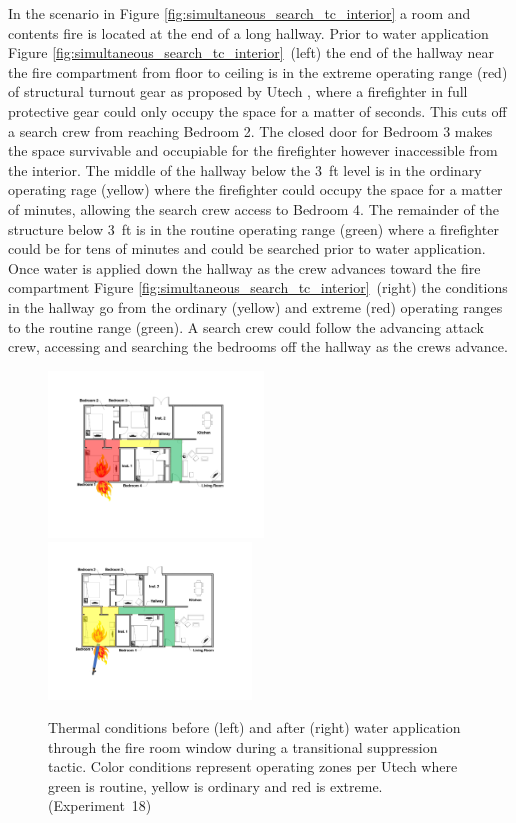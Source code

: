 \documentclass[12pt,oneside]{book}
\begin{document}
In the scenario in Figure \ref{fig:simultaneous_search_tc_interior} a room and contents fire is located at the end of a long hallway. Prior to water application Figure \ref{fig:simultaneous_search_tc_interior}~(left) the end of the hallway near the fire compartment from floor to ceiling is in the extreme operating range (red) of structural turnout gear as proposed by Utech \cite{Utech_Firefighter_Clothing}, where a firefighter in full protective gear could only occupy the space for a matter of seconds. This cuts off a search crew from reaching Bedroom 2. The closed door for Bedroom 3 makes the space survivable and occupiable for the firefighter however inaccessible from the interior. The middle of the hallway below the 3~ft level is in the ordinary operating rage (yellow) where the firefighter could occupy the space for a matter of minutes, allowing the search crew access to Bedroom 4. The remainder of the structure below 3~ft is in the routine operating range (green) where a firefighter could be for tens of minutes and could be searched prior to water application. Once water is applied down the hallway as the crew advances toward the fire compartment Figure \ref{fig:simultaneous_search_tc_interior}~(right) the conditions in the hallway go from the ordinary (yellow) and extreme (red)  operating ranges to the routine range (green). A search crew could follow the advancing attack crew, accessing and searching the bedrooms off the hallway as the crews advance. 

\begin{figure}[H]
\centering
\includegraphics[width=0.51\textwidth]{../0_Images/Tactical_Considerations/Simultaneous_Search/Transitional_Pre}
\includegraphics[width=0.48\textwidth]{../0_Images/Tactical_Considerations/Simultaneous_Search/Transitional_Post}
\caption[Thermal Conditions - Simultaneous Search - Transitional]{Thermal conditions before (left) and after (right) water application through the fire room window during a transitional suppression tactic. Color conditions represent operating zones per Utech \cite{Utech_Firefighter_Clothing} where green is routine, yellow is ordinary and red is extreme. (Experiment~18)}
\label{fig:simultaneous_search_tc_trans}
\end{figure}
\end{document}
